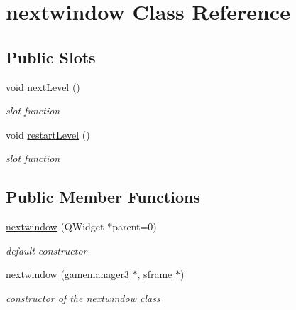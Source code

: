 \hypertarget{classnextwindow}{\section{nextwindow \-Class \-Reference}
\label{classnextwindow}
}
\subsection*{\-Public \-Slots}
\begin{DoxyCompactItemize}
\item 
void \hyperlink{classnextwindow_a480af59e0c8266ed2e4b7ee70fbe9650}{next\-Level} ()
\begin{DoxyCompactList}\small\item\em slot function \end{DoxyCompactList}\item 
void \hyperlink{classnextwindow_adadc3532646391ce1599a5c601465d94}{restart\-Level} ()
\begin{DoxyCompactList}\small\item\em slot function \end{DoxyCompactList}\end{DoxyCompactItemize}
\subsection*{\-Public \-Member \-Functions}
\begin{DoxyCompactItemize}
\item 
\hypertarget{classnextwindow_ab6c6fb42719fab970be2d5edcb0c6173}{\hyperlink{classnextwindow_ab6c6fb42719fab970be2d5edcb0c6173}{nextwindow} (\-Q\-Widget $\ast$parent=0)}\label{classnextwindow_ab6c6fb42719fab970be2d5edcb0c6173}

\begin{DoxyCompactList}\small\item\em default constructor \end{DoxyCompactList}\item 
\hyperlink{classnextwindow_a77be763bea61d173e48a2e925e2ee7f5}{nextwindow} (\hyperlink{classgamemanager3}{gamemanager3} $\ast$, \hyperlink{classsframe}{sframe} $\ast$)
\begin{DoxyCompactList}\small\item\em constructor of the nextwindow class \end{DoxyCompactList}\end{DoxyCompactItemize}
